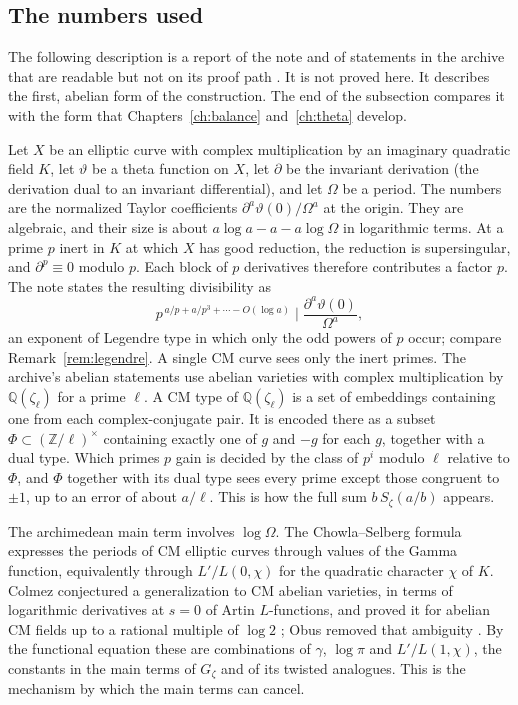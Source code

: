 \documentclass[11pt]{amsbook}
\theoremstyle{plain}
\theoremstyle{definition}
\theoremstyle{remark}
\numberwithin{equation}{section}
\numberwithin{figure}{chapter}
\numberwithin{table}{chapter}
\newcommand{\Q}{\mathbb{Q}}
\newcommand{\Z}{\mathbb{Z}}
\newcommand{\Gz}{G_{\zeta}}
\newcommand{\Sz}{S_{\zeta}}
\begin{document}
\subsection{The numbers used}

The following description is a report of the note
\cite[p.~3, step~2]{AlpogeRemark2026} and of statements in the
archive that are readable but not on its proof path
\cite[\nolinkurl{Formalism/StatementCM.lean},
\nolinkurl{Formalism/ProductFormula/StatementOCCM.lean}]
{AlpogeArchive2026}. It is not proved here. It describes the first,
abelian form of the construction. The end of the subsection
compares it with the form that Chapters~\ref{ch:balance}
and~\ref{ch:theta} develop.

Let $X$ be an elliptic curve with complex multiplication by an
imaginary quadratic field $K$, let $\vartheta$ be a theta function
on $X$, let $\partial$ be the invariant derivation (the derivation
dual to an invariant differential), and let $\Omega$ be a period.
The numbers are the normalized Taylor coefficients
$\partial^a\vartheta(0)/\Omega^a$ at the origin. They are algebraic,
and their size is about $a\log a - a - a\log\Omega$ in logarithmic
terms. At a prime $p$ inert in $K$ at which $X$ has good reduction,
the reduction is supersingular, and $\partial^p \equiv 0$ modulo
$p$. Each block of $p$ derivatives therefore contributes a factor
$p$. The note states the resulting divisibility as
\[
  p^{\,a/p + a/p^3 + \cdots - O(\log a)}
  \;\Big|\; \frac{\partial^a\vartheta(0)}{\Omega^a},
\]
an exponent of Legendre type in which only the odd powers of $p$
occur; compare Remark~\ref{rem:legendre}. A single CM curve sees
only the inert primes. The archive's abelian statements use abelian
varieties with complex multiplication by $\Q(\zeta_\ell)$ for a
prime $\ell$. A CM type of $\Q(\zeta_\ell)$ is a set of embeddings
containing one from each complex-conjugate pair. It is encoded
there as a subset $\Phi \subset (\Z/\ell)^\times$ containing exactly
one of $g$ and $-g$ for each $g$, together with a dual type. Which
primes $p$ gain is decided by the class of $p^i$ modulo $\ell$
relative to $\Phi$, and $\Phi$ together with its dual type sees
every prime except those congruent to $\pm 1$, up to an error of
about $a/\ell$. This is how the full sum $b\,\Sz(a/b)$ appears.

The archimedean main term involves $\log\Omega$. The Chowla--Selberg
formula \cite{ChowlaSelberg1967} expresses the periods of CM
elliptic curves through values of the Gamma function, equivalently
through $L'/L(0,\chi)$ for the quadratic character $\chi$ of $K$.
Colmez conjectured a generalization to CM abelian varieties, in
terms of logarithmic derivatives at $s = 0$ of Artin $L$-functions,
and proved it for abelian CM fields up to a rational multiple of
$\log 2$ \cite{Colmez1993}; Obus removed that ambiguity
\cite{Obus2013}. By the functional equation these are combinations
of $\gamma$, $\log\pi$ and $L'/L(1,\chi)$, the constants in the main
terms of $\Gz$ and of its twisted analogues. This is the mechanism
by which the main terms can cancel.
\end{document}
